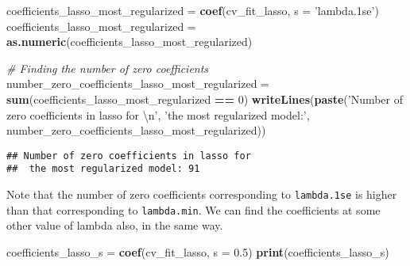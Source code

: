 \documentclass[
]{book}
\newenvironment{Shaded}{\begin{snugshade}}{\end{snugshade}}
\newcommand{\CharTok}[1]{\textcolor[rgb]{0.31,0.60,0.02}{#1}}
\newcommand{\CommentTok}[1]{\textcolor[rgb]{0.56,0.35,0.01}{\textit{#1}}}
\newcommand{\DataTypeTok}[1]{\textcolor[rgb]{0.13,0.29,0.53}{#1}}
\newcommand{\DecValTok}[1]{\textcolor[rgb]{0.00,0.00,0.81}{#1}}
\newcommand{\FloatTok}[1]{\textcolor[rgb]{0.00,0.00,0.81}{#1}}
\newcommand{\KeywordTok}[1]{\textcolor[rgb]{0.13,0.29,0.53}{\textbf{#1}}}
\newcommand{\NormalTok}[1]{#1}
\newcommand{\OperatorTok}[1]{\textcolor[rgb]{0.81,0.36,0.00}{\textbf{#1}}}
\newcommand{\StringTok}[1]{\textcolor[rgb]{0.31,0.60,0.02}{#1}}
\begin{document}
\begin{Shaded}
\begin{Highlighting}[]
\NormalTok{coefficients_lasso_most_regularized =}
\StringTok{  }\KeywordTok{coef}\NormalTok{(cv_fit_lasso, }\DataTypeTok{s =} \StringTok{'lambda.1se'}\NormalTok{)}
\NormalTok{coefficients_lasso_most_regularized =}
\StringTok{  }\KeywordTok{as.numeric}\NormalTok{(coefficients_lasso_most_regularized)}

\CommentTok{# Finding the number of zero coefficients}
\NormalTok{number_zero_coefficients_lasso_most_regularized =}
\StringTok{  }\KeywordTok{sum}\NormalTok{(coefficients_lasso_most_regularized }\OperatorTok{==}\StringTok{ }\DecValTok{0}\NormalTok{)}
\KeywordTok{writeLines}\NormalTok{(}\KeywordTok{paste}\NormalTok{(}\StringTok{'Number of zero coefficients in lasso for }\CharTok{\textbackslash{}n}\StringTok{'}\NormalTok{,}
                 \StringTok{'the most regularized model:'}\NormalTok{,}
\NormalTok{                 number_zero_coefficients_lasso_most_regularized))}
\end{Highlighting}
\end{Shaded}

\begin{verbatim}
## Number of zero coefficients in lasso for 
##  the most regularized model: 91
\end{verbatim}

Note that the number of zero coefficients corresponding to \texttt{lambda.1se} is higher than that corresponding to \texttt{lambda.min}. We can find the coefficients at some other value of lambda also, in the same way.

\begin{Shaded}
\begin{Highlighting}[]
\NormalTok{coefficients_lasso_s =}\StringTok{ }\KeywordTok{coef}\NormalTok{(cv_fit_lasso, }\DataTypeTok{s =} \FloatTok{0.5}\NormalTok{)}
\KeywordTok{print}\NormalTok{(coefficients_lasso_s)}
\end{Highlighting}
\end{Shaded}
\end{document}

